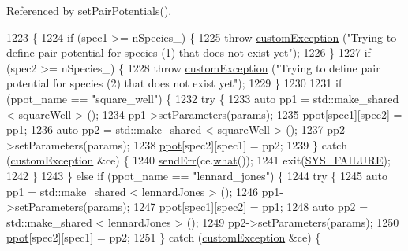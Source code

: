 Referenced by set\-Pair\-Potentials().


\begin{DoxyCode}
1223                                                                                                            
                                                \{
1224     \textcolor{keywordflow}{if} (spec1 >= nSpecies\_) \{
1225         \textcolor{keywordflow}{throw} \hyperlink{classcustom_exception}{customException} (\textcolor{stringliteral}{"Trying to define pair potential for species (1) that does
       not exist yet"});
1226     \}
1227     \textcolor{keywordflow}{if} (spec2 >= nSpecies\_) \{
1228         \textcolor{keywordflow}{throw} \hyperlink{classcustom_exception}{customException} (\textcolor{stringliteral}{"Trying to define pair potential for species (2) that does
       not exist yet"});
1229     \}
1230 
1231     \textcolor{keywordflow}{if} (ppot\_name == \textcolor{stringliteral}{"square\_well"}) \{
1232         \textcolor{keywordflow}{try} \{
1233             \textcolor{keyword}{auto} pp1 = std::make\_shared < squareWell > ();
1234             pp1->setParameters(params);
1235             \hyperlink{classsim_system_ad2e290b5963f132e6a3a56cee35c8e9f}{ppot}[spec1][spec2] = pp1;
1236             \textcolor{keyword}{auto} pp2 = std::make\_shared < squareWell > ();
1237             pp2->setParameters(params);
1238             \hyperlink{classsim_system_ad2e290b5963f132e6a3a56cee35c8e9f}{ppot}[spec2][spec1] = pp2;
1239         \} \textcolor{keywordflow}{catch} (\hyperlink{classcustom_exception}{customException} &ce) \{
1240             \hyperlink{utilities_8cpp_a6dacf3c3c19aa1e13a4d5a148fe5114e}{sendErr}(ce.\hyperlink{classcustom_exception_aeb6ab5848b038adfc68fde86a512f691}{what}());
1241             exit(\hyperlink{global_8h_a428dfe1ef0a6ff4b1fdebf275f6aff2e}{SYS\_FAILURE});
1242         \}
1243     \} \textcolor{keywordflow}{else} \textcolor{keywordflow}{if} (ppot\_name == \textcolor{stringliteral}{"lennard\_jones"}) \{
1244         \textcolor{keywordflow}{try} \{
1245             \textcolor{keyword}{auto} pp1 = std::make\_shared < lennardJones > ();
1246             pp1->setParameters(params);
1247             \hyperlink{classsim_system_ad2e290b5963f132e6a3a56cee35c8e9f}{ppot}[spec1][spec2] = pp1;
1248             \textcolor{keyword}{auto} pp2 = std::make\_shared < lennardJones > ();
1249             pp2->setParameters(params);
1250             \hyperlink{classsim_system_ad2e290b5963f132e6a3a56cee35c8e9f}{ppot}[spec2][spec1] = pp2;
1251         \} \textcolor{keywordflow}{catch} (\hyperlink{classcustom_exception}{customException} &ce) \{

\end{DoxyCode}
